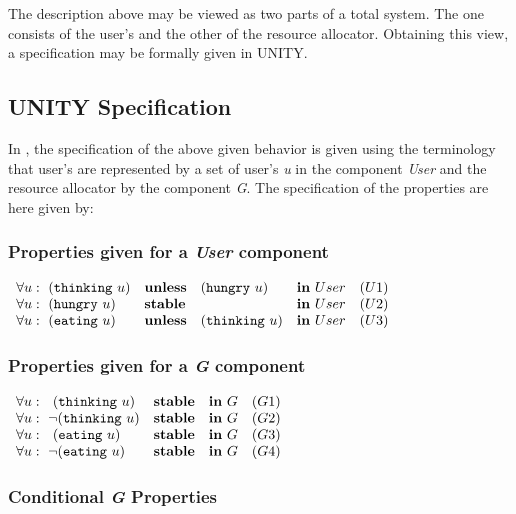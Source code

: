 The description above may be viewed as two parts of a total system.  The one
consists of the user's and the other of the resource allocator.  Obtaining
this view, a specification may be formally given in UNITY.

\subsection{UNITY Specification}

In \cite{CM88}, the specification of the above given behavior is given using
the terminology that user's are represented by a set of user's {\it u} in the 
component {\it User} and the resource allocator by the component {\it G}.  The
specification of the properties are here given by:

\subsubsection{Properties given for a {\it User} component}

\cn $\begin{array}{lllll}
 \forall u:\ ({\tt thinking}\ u) & {\bf unless} & ({\tt hungry}\ u)   &
                       {\bf in}\ User &  (U1)\\
 \forall u:\ ({\tt hungry}\ u)   & {\bf stable} &              &
                       {\bf in}\ User &  (U2)\\
 \forall u:\ ({\tt eating}\ u)   & {\bf unless} & ({\tt thinking}\ u) &
                       {\bf in}\ User &  (U3)
\end{array}$

\subsubsection{Properties given for a {\it G} component}

\cn $\begin{array}{lllll}
 \forall u:\ \ ({\tt thinking}\ u)    & {\bf stable} & {\bf in}\ G & (G1)\\
 \forall u:\ \neg({\tt thinking}\ u) & {\bf stable} & {\bf in}\ G  & (G2)\\
 \forall u:\ \ ({\tt eating}\ u)      & {\bf stable} & {\bf in}\ G & (G3)\\
 \forall u:\ \neg({\tt eating}\ u)   & {\bf stable} & {\bf in}\ G  & (G4)
\end{array}$

\subsubsection{Conditional {\it G} Properties}

